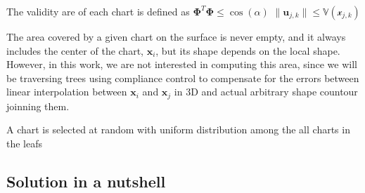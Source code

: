 The validity are of each chart is defined as
$\boldsymbol{\Phi}^{T}\boldsymbol{\Phi} \leq \cos(\alpha)$
$\| \mathbf{u}_{j,k} \| \leq \mathbb{V}(\mathcal{x}_{j,k})$

The area covered by a given chart on the surface is never empty, and
it always includes the center of the chart, $\mathbf{x}_{i}$, but its shape depends on the local shape. However, in this work, we are not interested in computing this area, since we will be traversing trees using compliance control to compensate for the errors between linear interpolation between $\mathbf{x}_i$ and $\mathbf{x}_j$ in 3D and actual arbitrary shape countour joinning them.

 A chart is selected at random with uniform distribution
among the all charts in the leafs

\subsection{Solution in a nutshell}
\label{sec:summary}


